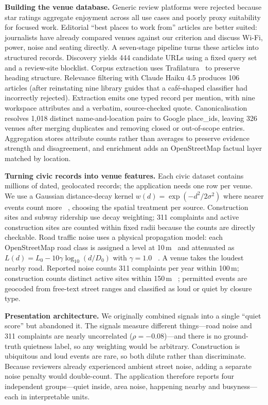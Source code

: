 \documentclass[conference]{IEEEtran}
\begin{document}
\textbf{Building the venue database.} Generic review platforms were rejected because star ratings aggregate enjoyment across all use cases and poorly proxy suitability for focused work. Editorial ``best places to work from'' articles are better suited: journalists have already compared venues against our criterion and discuss Wi-Fi, power, noise and seating directly. A seven-stage pipeline turns these articles into structured records. Discovery yields 444 candidate URLs using a fixed query set and a review-site blocklist. Corpus extraction uses Trafilatura~
\cite{barbaresi2021trafilatura} to preserve heading structure. Relevance filtering with Claude Haiku 4.5 produces 106 articles (after reinstating nine library guides that a café-shaped classifier had incorrectly rejected). Extraction emits one typed record per mention, with nine workspace attributes and a verbatim, source-checked quote. Canonicalisation resolves 1,018 distinct name-and-location pairs to Google place\_ids, leaving 326 venues after merging duplicates and removing closed or out-of-scope entries. Aggregation stores attribute counts rather than averages to preserve evidence strength and disagreement, and enrichment adds an OpenStreetMap factual layer matched by location.

\textbf{Turning civic records into venue features.} Each civic dataset contains millions of dated, geolocated records; the application needs one row per venue. We use a Gaussian distance-decay kernel $w(d)=\exp(-d^{2}/2\sigma^{2})$ where nearer events count more~
\cite{silverman1986density}, choosing the spatial treatment per source. Construction sites and subway ridership use decay weighting; 311 complaints and active construction sites are counted within fixed radii because the counts are directly checkable. Road traffic noise uses a physical propagation model: each OpenStreetMap road class is assigned a level at 10\,m~
\cite{almatawah2025traffic,staab2022predicting} and attenuated as $L(d)=L_{0}-10\gamma\log_{10}(d/D_{0})$ with $\gamma=1.0$~
\cite{iso9613-22024,crtn1988}. A venue takes the loudest nearby road. Reported noise counts 311 complaints per year within 100\,m; construction counts distinct active sites within 150\,m~
\cite{fhwaconstruction2006}; permitted events are geocoded from free-text street ranges and classified as loud or quiet by closure type.

\textbf{Presentation architecture.} We originally combined signals into a single ``quiet score'' but abandoned it. The signals measure different things---road noise and 311 complaints are nearly uncorrelated ($\rho=-0.08$)---and there is no ground-truth quietness label, so any weighting would be arbitrary. Construction is ubiquitous and loud events are rare, so both dilute rather than discriminate. Because reviewers already experienced ambient street noise, adding a separate noise penalty would double-count. The application therefore reports four independent groups---quiet inside, area noise, happening nearby and busyness---each in interpretable units.
\end{document}
